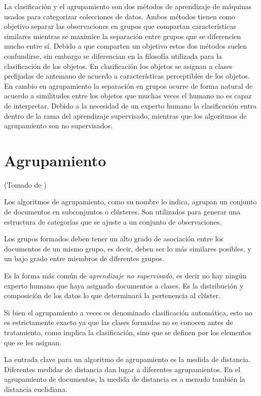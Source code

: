 \documentclass{llncs}
\begin{document}
La clasificaci\'on y el agrupamiento son dos m\'etodos de aprendizaje de m\'aquinas usados para categorizar colecciones de datos. Ambos m\'etodos tienen como objetivo separar las observaciones en grupos que compartan caracter\'isticas similares mientras se maximice la separaci\'on entre grupos que se diferencien mucho entre s\'i. Debido a que comparten un objetivo estos dos m\'etodos suelen confundirse, sin embargo se diferencian en la filosof\'ia utilizada para la clasificaci\'on de los objetos. En clasificaci\'on los objetos se asignan a clases prefijadas de antemano de acuerdo a caracter\'isticas perceptibles de los objetos. En cambio en agrupamiento la separaci\'on en grupos ocurre de forma natural de acuerdo a similitudes entre los objetos que muchas veces el humano no es capaz de interpretar. Debido a la necesidad de un experto humano la clasificaci\'on entra dentro de la rama del aprendizaje supervisado, mientras que los algoritmos de agrupamiento son no supervisados.

\section{Agrupamiento}

\begin{flushright}
	\scriptsize*(Tomado de \cite{B1})
	\normalsize
\end{flushright}

Los algoritmos de agrupamiento, como su nombre lo indica, agrupan un conjunto de documentos en subconjuntos o clústeres. Son utilizados para generar una estructura de categorías que se ajuste a un conjunto de observaciones. 

Los grupos formados deben tener un alto grado de asociación entre los documentos de un mismo grupo, es decir, deben ser lo m\'as similares posibles, y un bajo grado entre miembros de diferentes grupos. 

Es la forma más común de \textit{aprendizaje no supervisado}, es decir no hay ningún experto humano que haya asignado documentos a clases. Es la distribución y composición de los datos lo que determinará la pertenencia al clúster. 

Si bien el agrupamiento a veces es denominado clasificación automática, esto no es estrictamente exacto ya que las clases formadas no se conocen antes de tratamiento, como implica la clasificación, sino que se definen por los elementos que se les asignan.

La entrada clave para un algoritmo de agrupamiento es la medida de distancia. Diferentes medidas de distancia dan lugar a diferentes agrupamientos. En el agrupamiento de documentos, la medida de distancia es a menudo también la distancia euclidiana. 
\end{document}
